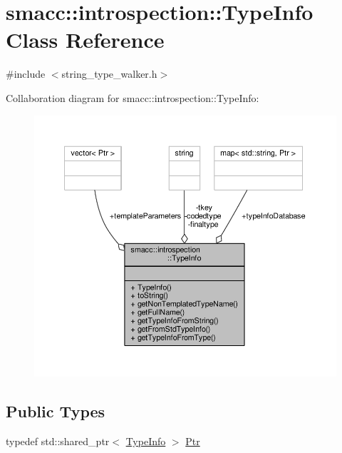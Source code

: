 \hypertarget{classsmacc_1_1introspection_1_1TypeInfo}{}\section{smacc\+:\+:introspection\+:\+:Type\+Info Class Reference}
\label{classsmacc_1_1introspection_1_1TypeInfo}


{\ttfamily \#include $<$string\+\_\+type\+\_\+walker.\+h$>$}



Collaboration diagram for smacc\+:\+:introspection\+:\+:Type\+Info\+:\nopagebreak
\begin{figure}[H]
\begin{center}
\leavevmode
\includegraphics[width=350pt]{classsmacc_1_1introspection_1_1TypeInfo__coll__graph}
\end{center}
\end{figure}
\subsection*{Public Types}
\begin{DoxyCompactItemize}
\item 
typedef std\+::shared\+\_\+ptr$<$ \hyperlink{classsmacc_1_1introspection_1_1TypeInfo}{Type\+Info} $>$ \hyperlink{classsmacc_1_1introspection_1_1TypeInfo_aa6ffd9c39811d59f7c771941b7fad860}{Ptr}
\end{DoxyCompactItemize}
